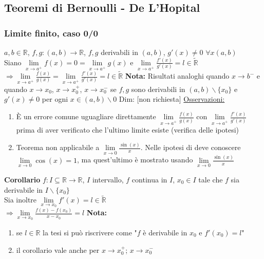 \documentclass{article}
\begin{document}
\subsection{Teoremi di Bernoulli - De L'Hopital}
\subsubsection{Limite finito, caso 0/0}
$a,b \in \mathbb{R}$, $f,g:(a,b) \to \mathbb{R}$, $f,g$ derivabili in $(a,b)$, $g'(x) \neq 0$ $\forall x (a,b)$\\
Siano $\lim\limits_ {x \to a^+ }f(x) = 0 = \lim\limits_ {x \to a^+}g(x)$ e $\lim\limits_ {x \to a^+}\frac{f'(x)}{g'(x)} = l \in \tilde{\mathbb{R}}$\\
$\Rightarrow \lim\limits_ {x \to a^+} \frac{f(x)}{g(x)} = \lim\limits_ {x \to a^+} \frac{f'(x)}{g'(x)} = l \in \tilde{\mathbb{R}}$
\bigbreak
\noindent \textbf{Nota:} Risultati analoghi quando $x \to b^-$ e quando $x \to x_0$, $x \to x_0^+$, $x \to x_0^-$ se $f,g$ sono derivabili in $(a,b) \backslash \{x_0\}$ e $g'(x) \neq 0$ per ogni $x \in (a,b) \backslash 0$  
\bigbreak
\noindent Dim: [non richiesta]
\bigbreak
\noindent \underline{Osservazioni:}
\begin{enumerate}
    \item È un errore comune uguagliare direttamente $\lim\limits_ {x \to a^+} \frac{f(x)}{g(x)}$ con $\lim\limits_ {x \to a^+} \frac{f'(x)}{g'(x)}$ prima di aver verificato che l'ultimo limite esiste (verifica delle ipotesi)

    \item Teorema non applicabile a $\lim\limits_ {x \to 0} \frac{\sin(x)}{x}$. Nelle ipotesi di deve conoscere $\lim\limits_ {x \to 0} \cos(x) = 1$, ma quest'ultimo è mostrato usando $\lim\limits_ {x \to 0} \frac{\sin(x)}{x}$
\end{enumerate}

\noindent \textbf{Corollario}
$f:I \subseteq \mathbb{R} \to \mathbb{R}$, $I$ intervallo, $f$ continua in $I$, $x_0 \in I$ tale che $f$ sia derivabile in $I \backslash \{x_0\}$\\
Sia inoltre $\lim\limits_ {x \to x_0} f'(x) = l \in \tilde{\mathbb{R}}$\\
$\Rightarrow \lim\limits_ {x \to x_0} \frac{f(x)-f(x_0)}{x-x_0} = l$
\bigbreak
\noindent \textbf{Nota:} 
\begin{enumerate}
    \item se $l \in \mathbb{R}$ la tesi si può riscrivere come "$f$ è derivabile in $x_0$ e $f'(x_0) = l$"
    \item il corollario vale anche per $x \to x_0^+$; $x \to x_0^-$
\end{enumerate}
\end{document}
